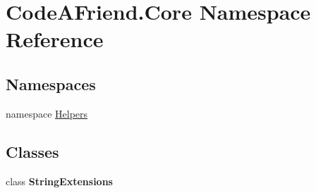 \hypertarget{namespace_code_a_friend_1_1_core}{}\section{Code\+A\+Friend.\+Core Namespace Reference}
\label{namespace_code_a_friend_1_1_core}
\subsection*{Namespaces}
\begin{DoxyCompactItemize}
\item 
namespace \mbox{\hyperlink{namespace_code_a_friend_1_1_core_1_1_helpers}{Helpers}}
\end{DoxyCompactItemize}
\subsection*{Classes}
\begin{DoxyCompactItemize}
\item 
class {\bfseries String\+Extensions}
\end{DoxyCompactItemize}
